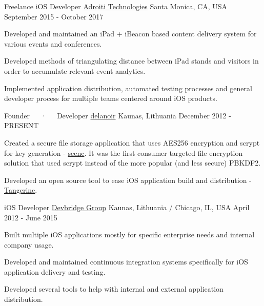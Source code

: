 \begin{cventries}
  \cventry
    {Freelance iOS Developer} %
    {\href{https://www.adroiti.com}{Adroiti Technologies}} %
    {Santa Monica, CA, USA} %
    {September 2015 - October 2017} %
    {
       \begin{cvitems} %
         \item {Developed and maintained an iPad + iBeacon based content delivery system for various events and conferences.}
         \item {Developed methods of triangulating distance between iPad stands and visitors in order to accumulate relevant event analytics.}
         \item {Implemented application distribution, automated testing processes and general developer process for multiple teams centered around iOS products.}
       \end{cvitems}
    }

  \cventry
    {Founder~~~·~~~Developer} %
    {\href{https://delanoir.com}{delanoir}} %
    {Kaunas, Lithuania} %
    {December 2012 - PRESENT} %
    {
      \begin{cvitems} %
        \item {Created a secure file storage application that uses AES256 encryption and scrypt for key generation - \href{http://appstore.com/seenc}{seenc}. It was the first consumer targeted file encryption solution that used scrypt instead of the more popular (and less secure) PBKDF2.}
        \item {Developed an open source tool to ease iOS application build and distribution - \href{http://github.com/carlossless/tangerine}{Tangerine}.}
      \end{cvitems}
    }

  \cventry
    {iOS Developer} %
    {\href{https://devbridge.com}{Devbridge Group}} %
    {Kaunas, Lithuania / Chicago, IL, USA} %
    {April 2012 - June 2015} %
    {
      \begin{cvitems} %
        \item {Built multiple iOS applications mostly for specific enterprise needs and internal company usage.}
        \item {Developed and maintained continuous integration systems specifically for iOS application delivery and testing.}
        \item {Developed several tools to help with internal and external application distribution.}
      \end{cvitems}
    }


\end{cventries}
